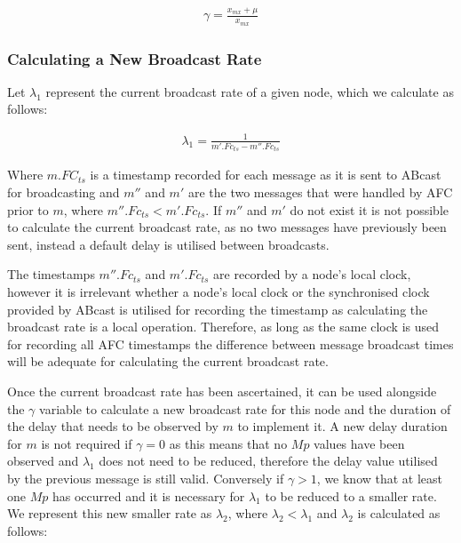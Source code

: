     \begin{equation*}
		     \begin{aligned}
		         \gamma = \frac{x_{mx} + \mu}{x_{mx}}
		     \end{aligned}
    \end{equation*} 
    
    \subsubsection*{Calculating a New Broadcast Rate}
    Let $\lambda_1$ represent the current broadcast rate of a given node, which we calculate as follows:

    \begin{equation*}
		     \begin{aligned}
		         \lambda_1 = \frac{1}{m'.Fc_{ts} - m''.Fc_{ts}}
		     \end{aligned}
    \end{equation*} 
    
    Where $m.FC_{ts}$ is a timestamp recorded for each message as it is sent to \textsf{ABcast} for broadcasting and $m''$ and $m'$ are the two messages that were handled by AFC prior to $m$, where $m''.Fc_{ts} < m'.Fc_{ts}$.  If $m''$ and $m'$ do not exist it is not possible to calculate the current broadcast rate, as no two messages have previously been sent, instead a default delay is utilised between broadcasts.  
    
    The timestamps $m''.Fc_{ts}$ and $m'.Fc_{ts}$ are recorded by a node's local clock, however it is irrelevant whether a node's local clock or the  synchronised clock provided by \textsf{ABcast} is utilised for recording the timestamp as calculating the broadcast rate is a local operation.  Therefore, as long as the same clock is used for recording all AFC timestamps the difference between message broadcast times will be adequate for calculating the current broadcast rate.   
    
    Once the current broadcast rate has been ascertained, it can be used alongside the $\gamma$ variable to calculate a new broadcast rate for this node and the duration of the delay that needs to be observed by $m$ to implement it.  A new delay duration for $m$ is not required if $\gamma = 0$ as this means that no $Mp$ values have been observed and $\lambda_1$ does not need to be reduced, therefore the delay value utilised by the previous message is still valid.  Conversely if $\gamma > 1$, we know that at least one $Mp$ has occurred and it is necessary for $\lambda_1$ to be reduced to a smaller rate.  We represent this new smaller rate as $\lambda_2$, where $\lambda_2 < \lambda_1$ and $\lambda_2$ is calculated as follows:
    
